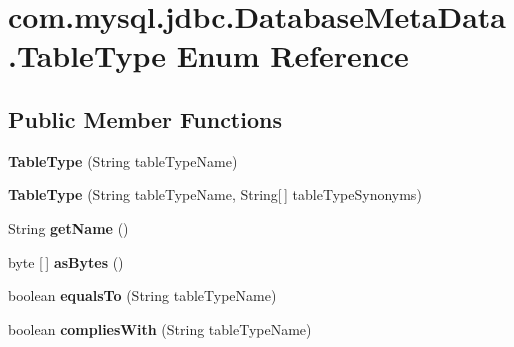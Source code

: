 \hypertarget{enumcom_1_1mysql_1_1jdbc_1_1_database_meta_data_1_1_table_type}{}\section{com.\+mysql.\+jdbc.\+Database\+Meta\+Data.\+Table\+Type Enum Reference}
\label{enumcom_1_1mysql_1_1jdbc_1_1_database_meta_data_1_1_table_type}
\subsection*{Public Member Functions}
\begin{DoxyCompactItemize}
\item 
\mbox{\label{enumcom_1_1mysql_1_1jdbc_1_1_database_meta_data_1_1_table_type_ad8d2ca17c16bc0d9d31393f52cc34365}} 
{\bfseries Table\+Type} (String table\+Type\+Name)
\item 
\mbox{\label{enumcom_1_1mysql_1_1jdbc_1_1_database_meta_data_1_1_table_type_a66586791d8398b2030c89421db55a2fb}} 
{\bfseries Table\+Type} (String table\+Type\+Name, String\mbox{[}$\,$\mbox{]} table\+Type\+Synonyms)
\item 
\mbox{\label{enumcom_1_1mysql_1_1jdbc_1_1_database_meta_data_1_1_table_type_a60440f2cc39a56bf0e678825bb9688c2}} 
String {\bfseries get\+Name} ()
\item 
\mbox{\label{enumcom_1_1mysql_1_1jdbc_1_1_database_meta_data_1_1_table_type_a2489c4bda594cef31695c7f93a7a33cd}} 
byte \mbox{[}$\,$\mbox{]} {\bfseries as\+Bytes} ()
\item 
\mbox{\label{enumcom_1_1mysql_1_1jdbc_1_1_database_meta_data_1_1_table_type_a9ba5f3d06566ae6ca4cf9e02dd8c0e8a}} 
boolean {\bfseries equals\+To} (String table\+Type\+Name)
\item 
\mbox{\label{enumcom_1_1mysql_1_1jdbc_1_1_database_meta_data_1_1_table_type_a09fd3e3326868e1722dc4408600d5568}} 
boolean {\bfseries complies\+With} (String table\+Type\+Name)
\end{DoxyCompactItemize}
